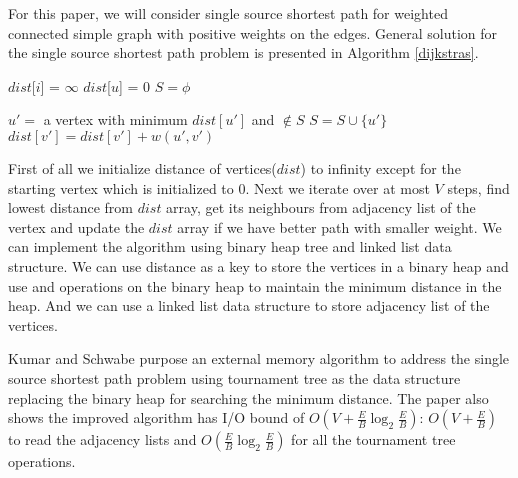 \documentclass[final,3p]{CSP}
\begin{document}
    For this paper, we will consider single source shortest path for weighted connected simple graph with positive weights on the edges. General solution for the single source shortest path problem is presented in Algorithm \ref{dijkstras}.
    \begin{algorithm}
        \caption{}\label{dijkstras}
        \begin{algorithmic}[1]
            \State $dist$[$i$] = $\infty$       
            \EndFor
            \State $dist$[$u$] = $0$    
            \State $S = \phi$

                      
            \State $u' = $ a vertex with minimum $dist[u']$ and $\not \in S$
            \State $S = S \cup \{u'\}$
                     
            \State $dist[v'] = dist[v'] + w(u', v')$
            \EndIf
            \EndFor
            \EndWhile
            \State {}
        \end{algorithmic}
    \end{algorithm}

    First of all we initialize distance of vertices($dist$) to infinity except for the starting vertex which is initialized to $0$. Next we iterate over at most $V$ steps, find lowest distance from $dist$ array, get its neighbours from adjacency list of the vertex and update the $dist$ array if we have better path with smaller weight.
    We can implement the algorithm using binary heap tree and linked list data structure. We can use distance as a key to store the vertices in a binary heap and use  and  operations on the binary heap to maintain the minimum distance in the heap. And we can use a linked list data structure to store adjacency list of the vertices.

    Kumar and Schwabe\cite{kumar1996improved} purpose an external memory algorithm to address the single source shortest path problem using tournament tree as the data structure replacing the binary heap for searching the minimum distance. The paper also shows the improved algorithm has I/O bound of $O(V + \frac{E}{B}\log_2{\frac{E}{B}})$: $O(V + \frac{E}{B})$ to read the adjacency lists and $O(\frac{E}{B}\log_2{\frac{E}{B}})$ for all the tournament tree operations.
\end{document}
